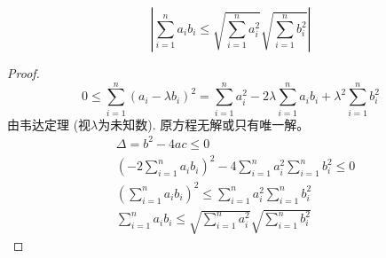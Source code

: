 \begin{equation*}
	|\sum_{i=1}^n a_i b_i \leqslant \sqrt{\sum_{i=1}^n a_i^2}\sqrt{\sum_{i=1}^n b_i^2}|
\end{equation*}

\begin{proof}
	\begin{equation*}
		 0 \leqslant \sum_{i=1}^n (a_i - \lambda b_i)^2  = \sum_{i=1}^n a_i^2 - 2 \lambda \sum_{i=1}^n a_i b_i  + \lambda^2 \sum_{i=1}^n b_i^2
	\end{equation*}
	由韦达定理 (视$ \lambda $为未知数). 原方程无解或只有唯一解。
	\begin{align*}
		&\Delta = b^2-4ac \leqslant 0\\
		&(-2\sum_{i=1}^n a_i b_i)^2 - 4\sum_{i=1}^n a_i^2 \sum_{i=1}^n b_i^2 \leqslant 0 \\
		&(\sum_{i=1}^n a_i b_i)^2 \leqslant \sum_{i=1}^n a_i^2 \sum_{i=1}^n b_i^2 \\
		&\sum_{i=1}^n a_i b_i \leqslant \sqrt{\sum_{i=1}^n a_i^2} \sqrt{\sum_{i=1}^n b_i^2} 
	\end{align*}
\end{proof}

